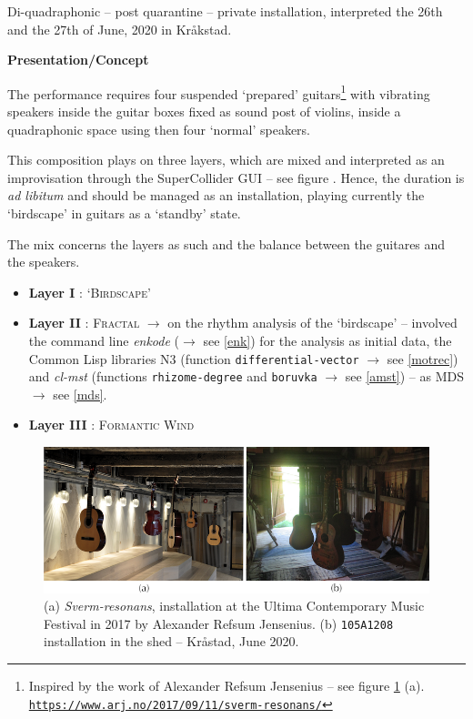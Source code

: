Di-quadraphonic -- post quarantine -- private installation, interpreted the 26th and the 27th of June, 2020 in Kråkstad.

\bigskip

\noindent \textbf{{\large Presentation/Concept}}
\hrulefill

\bigskip

The performance requires four suspended `prepared' guitars\footnote{Inspired by the work of Alexander Refsum Jensenius -- see figure \ref{arj} (a). \\ \href{https://www.arj.no/2017/09/11/sverm-resonans/}{\scriptsize{\texttt{https://www.arj.no/2017/09/11/sverm-resonans/}}}
} with vibrating speakers inside the guitar boxes fixed as sound post of violins, inside a quadraphonic space using then four `normal' speakers.

This composition plays on three layers, which are mixed and interpreted as an improvisation through the SuperCollider GUI -- see figure . Hence, the duration is \textit{ad libitum} and should be managed as an installation, playing currently the `birdscape' in guitars as a `standby' state. 

The mix concerns 
the layers as such and the balance between the guitares and the speakers.

\begin{itemize}[leftmargin=0.4in]
\item \textbf{Layer I} : \textsc{`Birdscape'} 
\item \textbf{Layer II} : \textsc{Fractal} $\rightarrow$ on the rhythm analysis of the `birdscape' -- involved the command line \textsl{enkode} ($\rightarrow$ see \ref{enk}) for the analysis as initial data, the Common Lisp libraries N3 (function \texttt{differential-vector} $\rightarrow$ see \ref{motrec}) and \textsl{cl-mst} (functions \texttt{rhizome-degree} and \texttt{boruvka} $\rightarrow$ see \ref{amst}) -- as MDS $\rightarrow$ see \ref{mds}. 
\item \textbf{Layer III} : \textsc{Formantic Wind} 
\end{itemize}

 \begin{figure}[hbt]
\begin{center}
	\includegraphics[width=\textwidth]{img/6757}		
\caption{(a) \textit{Sverm-resonans}, installation at the Ultima Contemporary Music Festival in 2017 by Alexander Refsum Jensenius. (b) \texttt{105A1208} installation in the shed -- Kråstad, June 2020.}
\label{arj}
\end{center}
\end{figure}

